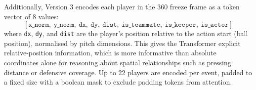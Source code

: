 Additionally, Version 3 encodes each player in the 360 freeze frame as a token vector of 8 values:
\[
[\texttt{x\_norm},\ \texttt{y\_norm},\ \texttt{dx},\ \texttt{dy},\ \texttt{dist},\ \texttt{is\_teammate},\ \texttt{is\_keeper},\ \texttt{is\_actor}]
\]
where \texttt{dx}, \texttt{dy}, and \texttt{dist} are the player's position relative to the action start (ball position), normalised by pitch dimensions. This gives the Transformer explicit relative-position information, which is more informative than absolute coordinates alone for reasoning about spatial relationships such as pressing distance or defensive coverage. Up to 22 players are encoded per event, padded to a fixed size with a boolean mask to exclude padding tokens from attention.

